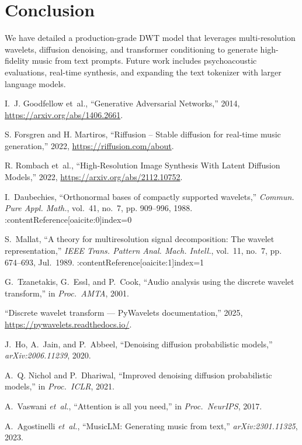 \documentclass[12pt]{report}
\begin{document}
\chapter{Conclusion}

We have detailed a production-grade DWT model that leverages multi-resolution wavelets, diffusion denoising, and transformer conditioning to generate high-fidelity music from text prompts. Future work includes psychoacoustic evaluations, real-time synthesis, and expanding the text tokenizer with larger language models.

\begin{thebibliography}{99}

I.~J. Goodfellow et~al., “Generative Adversarial Networks,” 2014, \url{https://arxiv.org/abs/1406.2661}.

S. Forsgren and H. Martiros, “Riffusion – Stable diffusion for real‐time music generation,” 2022, \url{https://riffusion.com/about}.

R. Rombach et~al., “High‐Resolution Image Synthesis With Latent Diffusion Models,” 2022, \url{https://arxiv.org/abs/2112.10752}.

I.~Daubechies, “Orthonormal bases of compactly supported wavelets,”
  \emph{Commun. Pure Appl. Math.}, vol.~41, no.~7, pp. 909--996, 1988. :contentReference[oaicite:0]{index=0}

S.~Mallat, “A theory for multiresolution signal decomposition: The wavelet
  representation,” \emph{IEEE Trans. Pattern Anal. Mach. Intell.}, vol.~11,
  no.~7, pp. 674--693, Jul.\ 1989. :contentReference[oaicite:1]{index=1}

G.~Tzanetakis, G.~Essl, and P.~Cook, “Audio analysis using the discrete
  wavelet transform,” in \emph{Proc.\ AMTA}, 2001.

“Discrete wavelet transform — PyWavelets documentation,” 2025,
  \url{https://pywavelets.readthedocs.io/}. 

J.~Ho, A.~Jain, and P.~Abbeel, “Denoising diffusion probabilistic models,”
  \emph{arXiv:2006.11239}, 2020. 

A.~Q. Nichol and P.~Dhariwal, “Improved denoising diffusion probabilistic
  models,” in \emph{Proc.\ ICLR}, 2021. 

A.~Vaswani \emph{et~al.}, “Attention is all you need,” in \emph{Proc.\ NeurIPS},
  2017. 

A.~Agostinelli \emph{et~al.}, “MusicLM: Generating music from text,”
  \emph{arXiv:2301.11325}, 2023. 

\end{thebibliography}
\end{document}
